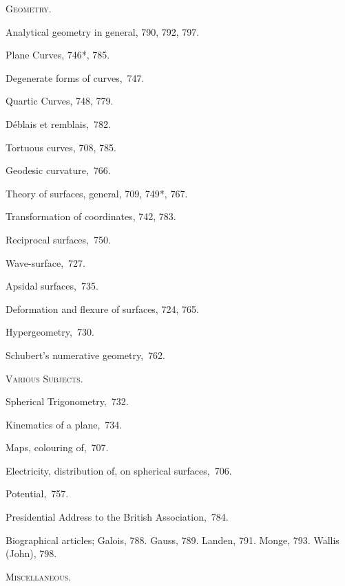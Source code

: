 \documentclass[12pt,a4paper,oneside]{book}
\begin{document}
\noindent\textsc{Geometry.}

\begin{list}{}{%
  \setlength{\leftmargin}{2em}\setlength{\itemsep}{0pt}%
  \setlength{\parsep}{0pt}\setlength{\topsep}{0.3em}}
\item Analytical geometry in general, 790, 792, 797.
\item Plane Curves, 746*, 785.
\item Degenerate forms of curves,~747.
\item Quartic Curves, 748, 779.
\item D\'eblais et remblais,~782.
\item Tortuous curves, 708, 785.
\item Geodesic curvature,~766.
\item Theory of surfaces, general, 709, 749*, 767.
\item Transformation of coordinates, 742, 783.
\item Reciprocal surfaces,~750.
\item Wave-surface,~727.
\item Apsidal surfaces,~735.
\item Deformation and flexure of surfaces, 724, 765.
\item Hypergeometry,~730.
\item Schubert's numerative geometry,~762.
\end{list}

\medskip

\noindent\textsc{Various Subjects.}

\begin{list}{}{%
  \setlength{\leftmargin}{2em}\setlength{\itemsep}{0pt}%
  \setlength{\parsep}{0pt}\setlength{\topsep}{0.3em}}
\item Spherical Trigonometry,~732.
\item Kinematics of a plane,~734.
\item Maps, colouring of,~707.
\item Electricity, distribution of, on spherical surfaces,~706.
\item Potential,~757.
\item Presidential Address to the British Association,~784.
\item Biographical articles; Galois, 788. Gauss, 789. Landen, 791. Monge, 793. Wallis (John), 798.
\end{list}

\medskip

\noindent\textsc{Miscellaneous.}
\end{document}
